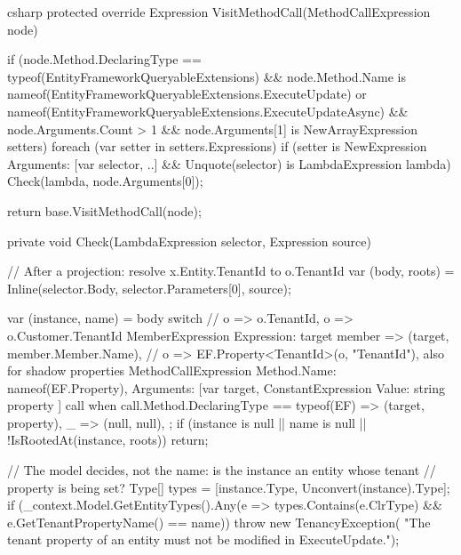 \begin{sourcecode}{csharp}
protected override Expression VisitMethodCall(MethodCallExpression node)
{
    if (node.Method.DeclaringType == typeof(EntityFrameworkQueryableExtensions)
        && node.Method.Name is nameof(EntityFrameworkQueryableExtensions.ExecuteUpdate)
            or nameof(EntityFrameworkQueryableExtensions.ExecuteUpdateAsync)
        && node.Arguments.Count > 1
        && node.Arguments[1] is NewArrayExpression setters)
    {
        foreach (var setter in setters.Expressions)
        {
            if (setter is NewExpression { Arguments: [var selector, ..] }
                && Unquote(selector) is LambdaExpression lambda)
                Check(lambda, node.Arguments[0]);
        }
    }

    return base.VisitMethodCall(node);
}

private void Check(LambdaExpression selector, Expression source)
{
    // After a projection: resolve x.Entity.TenantId to o.TenantId
    var (body, roots) = Inline(selector.Body, selector.Parameters[0], source);

    var (instance, name) = body switch
    {
        // o => o.TenantId, o => o.Customer.TenantId
        MemberExpression { Expression: { } target } member => (target, member.Member.Name),
        // o => EF.Property<TenantId>(o, "TenantId"), also for shadow properties
        MethodCallExpression
        {
            Method.Name: nameof(EF.Property),
            Arguments: [var target, ConstantExpression { Value: string property }]
        } call when call.Method.DeclaringType == typeof(EF) => (target, property),
        _ => (null, null),
    };
    if (instance is null || name is null || !IsRootedAt(instance, roots))
        return;

    // The model decides, not the name: is the instance an entity whose tenant
    // property is being set?
    Type[] types = [instance.Type, Unconvert(instance).Type];
    if (_context.Model.GetEntityTypes().Any(e =>
            types.Contains(e.ClrType) && e.GetTenantPropertyName() == name))
        throw new TenancyException(
            "The tenant property of an entity must not be modified in ExecuteUpdate.");
}
\end{sourcecode}

